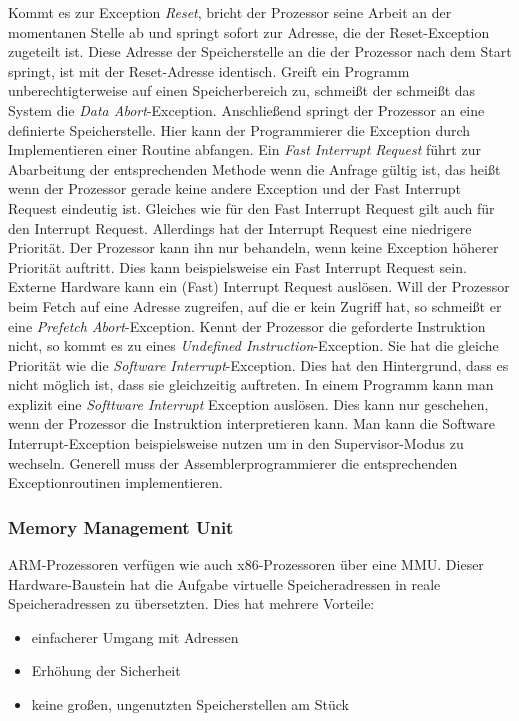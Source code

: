 Kommt es zur Exception \textit{Reset}, bricht der Prozessor seine Arbeit an der momentanen Stelle ab und springt sofort zur Adresse, die der Reset-Exception zugeteilt ist. Diese Adresse der Speicherstelle an die der Prozessor nach dem Start springt, ist mit der Reset-Adresse identisch. 
Greift ein Programm unberechtigterweise auf einen Speicherbereich zu, schmeißt der schmeißt das System die \textit{Data Abort}-Exception. Anschließend springt der Prozessor an eine definierte Speicherstelle. Hier kann der Programmierer die Exception durch Implementieren einer Routine abfangen. Ein \textit{Fast Interrupt Request} führt zur Abarbeitung der entsprechenden Methode wenn die Anfrage gültig ist, das heißt wenn der Prozessor gerade keine andere Exception und der Fast Interrupt Request eindeutig ist. Gleiches wie für den Fast Interrupt Request gilt auch für den Interrupt Request. Allerdings hat der Interrupt Request eine niedrigere Priorität. Der Prozessor kann ihn nur behandeln, wenn keine Exception höherer Priorität auftritt. Dies kann beispielsweise ein Fast Interrupt Request sein. Externe Hardware kann ein (Fast) Interrupt Request auslösen. 
Will der Prozessor beim Fetch auf eine Adresse zugreifen, auf die er kein Zugriff hat, so schmeißt er eine \textit{Prefetch Abort}-Exception. Kennt der Prozessor die geforderte Instruktion nicht, so kommt es zu eines \textit{Undefined Instruction}-Exception. Sie hat die gleiche Priorität wie die \textit{Software Interrupt}-Exception. Dies hat den Hintergrund, dass es nicht möglich ist, dass sie gleichzeitig auftreten. In einem Programm kann man explizit eine \textit{Softtware Interrupt} Exception auslösen. Dies kann nur geschehen, wenn der Prozessor die Instruktion interpretieren kann. Man kann die Software Interrupt-Exception beispielsweise nutzen um in den Supervisor-Modus zu wechseln.
Generell muss der Assemblerprogrammierer die entsprechenden Exceptionroutinen implementieren. 



\subsubsection{Memory Management Unit}
ARM-Prozessoren verfügen wie auch x86-Prozessoren über eine \ac{MMU}. Dieser Hardware-Baustein hat die Aufgabe virtuelle Speicheradressen in reale Speicheradressen zu übersetzten. Dies hat mehrere Vorteile: 
\begin{itemize}
\item einfacherer Umgang mit Adressen
\item Erhöhung der Sicherheit 
\item keine großen, ungenutzten Speicherstellen am Stück 
\end{itemize}

